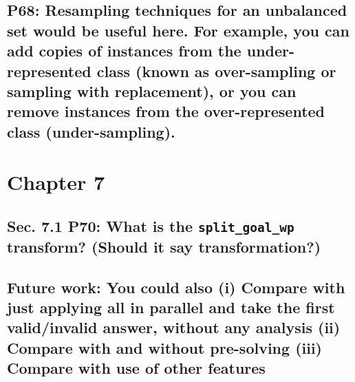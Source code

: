 \documentclass[]{article}
\begin{document}
\subsection{P68: Resampling techniques for an unbalanced set would be useful here. For example, you can add copies of instances from the under-represented class (known as over-sampling or sampling with replacement), or you can remove instances from the over-represented class (under-sampling).}

\section{Chapter 7}

\subsection{Sec. 7.1 P70: What is the \texttt{split\_goal\_wp} transform? (Should it say transformation?)}

\subsection{Future work: You could also (i) Compare with just applying all in parallel and take the first valid/invalid answer,	without any analysis (ii) Compare with and without pre-solving (iii) Compare with use of other features}
\end{document}
